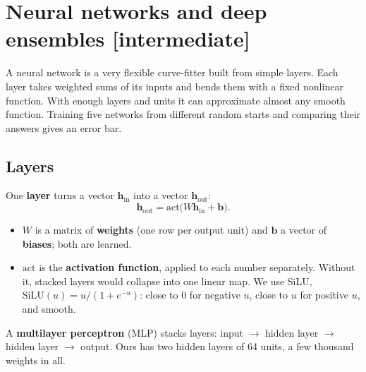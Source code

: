 \documentclass[11pt]{article}
\newcommand{\level}[1]{\hfill{\normalfont\small\color{black!60}[#1]}}
\begin{document}
\section{Neural networks and deep ensembles \level{intermediate}}
\label{sec:nn}

\begin{idea}
A neural network is a very flexible curve-fitter built from simple layers. Each layer takes weighted sums of its inputs and
bends them with a fixed nonlinear function. With enough layers and units it can approximate almost any smooth function. Training
five networks from different random starts and comparing their answers gives an error bar.
\end{idea}

\subsection{Layers}
One \textbf{layer} turns a vector $\bm h_\text{in}$ into a vector $\bm h_\text{out}$:
\begin{equation}
\bm h_\text{out} = \mathrm{act}\bigl(W\bm h_\text{in} + \bm b\bigr).
\end{equation}
\begin{itemize}
\item $W$ is a matrix of \textbf{weights} (one row per output unit) and $\bm b$ a vector of \textbf{biases}; both are learned.
\item $\mathrm{act}$ is the \textbf{activation function}, applied to each number separately. Without it, stacked layers would
  collapse into one linear map. We use SiLU, $\mathrm{SiLU}(u) = u/(1 + e^{-u})$: close to 0 for negative $u$, close to $u$
  for positive $u$, and smooth.
\end{itemize}
A \textbf{multilayer perceptron} (MLP) stacks layers: input $\to$ hidden layer $\to$ hidden layer $\to$ output. Ours has two hidden
layers of 64 units, a few thousand weights in all.
\end{document}
